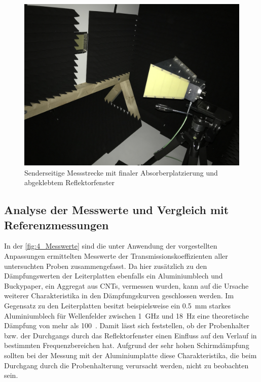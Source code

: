 \begin{figure}[H]
    \centering
    \includegraphics[height=.25\textheight, draft = false]{Abbildungen/Kapitel4/IMG_5719.jpg}
    \caption{Senderseitige Messstrecke mit finaler Absorberplatzierung und abgeklebtem Reflektorfenster}
    \label{fig:4_finaler_Aufbau}
\end{figure}


\subsection{Analyse der Messwerte und Vergleich mit Referenzmessungen}\label{cha:4_sub_Analyse_und_Vergleich}

In der \Abb\ref{fig:4_Messwerte} sind die unter Anwendung der vorgestellten Anpassungen ermittelten Messwerte der Transmissionskoeffizienten aller untersuchten Proben zusammengefasst. Da hier zusätzlich zu den Dämpfungswerten der Leiterplatten ebenfalls ein Aluminiumblech und Buckypaper, ein Aggregat aus \acp{CNT}, vermessen wurden, kann auf die Ursache weiterer Charakteristika in den Dämpfungskurven geschlossen werden. Im Gegensatz zu den Leiterplatten besitzt beispielsweise ein \SI{0,5}{\milli\meter} starkes Aluminiumblech für Wellenfelder zwischen \SI{1}{\giga\hertz} und \SI{18}{\hertz} eine theoretische Dämpfung von mehr als \SI{100}{\Dezibel}~\cite{EM_Schirmung}. Damit lässt sich feststellen, ob der Probenhalter bzw. der Durchgangs durch das Reflektorfenster einen Einfluss auf den Verlauf in bestimmten Frequenzbereichen hat. Aufgrund der sehr hohen Schirmdämpfung sollten bei der Messung mit der Aluminiumplatte diese Charakteristika, die beim Durchgang durch die Probenhalterung verursacht werden, nicht zu beobachten sein.
\par
\vspace{\linespace}

